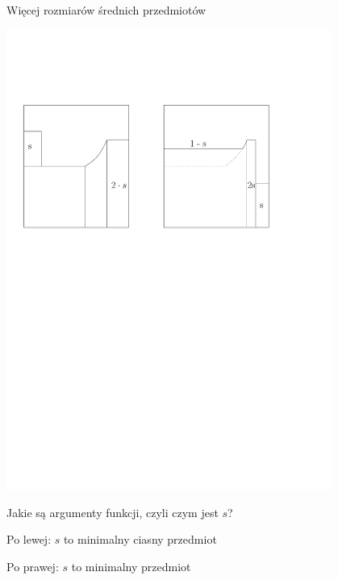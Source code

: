 \documentclass{beamer}
\begin{document}
\begin{frame}{Więcej rozmiarów średnich przedmiotów}
   \begin{center}
    \includegraphics[width=0.8\textwidth]{figs/G1G2.pdf}
  \end{center}

  Jakie są argumenty funkcji, czyli czym jest $s$?
  
  Po lewej: $s$ to minimalny ciasny przedmiot

  Po prawej: $s$ to minimalny przedmiot
\end{frame}
\end{document}
